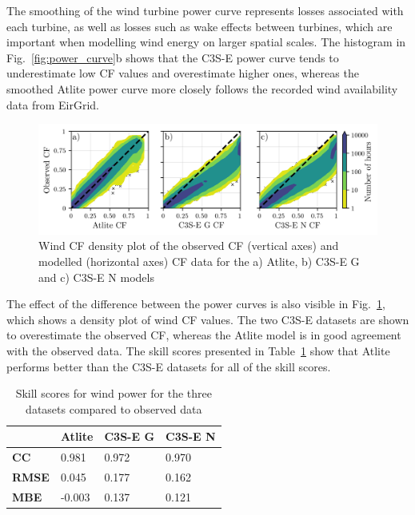 \documentclass[preprint, 12pt, authoryear]{elsarticle}
\begin{document}
The smoothing of the wind turbine power curve represents losses associated with each turbine, as well as losses such as wake effects between turbines, which are important when modelling wind energy on larger spatial scales. The histogram in Fig.~\ref{fig:power_curve}b shows that the C3S-E power curve tends to underestimate low CF values and overestimate higher ones, whereas the smoothed Atlite power curve more closely follows the recorded wind availability data from EirGrid.

\begin{figure}[!ht]
	\centering
	\includegraphics[width=\textwidth]{verification_wind_contour.png}
	\caption{Wind CF density plot of the observed CF (vertical axes) and modelled (horizontal axes) CF data for the a) Atlite, b) C3S-E G and c) C3S-E N models}
	\label{fig:wind_verification_contour}
\end{figure}

The effect of the difference between the power curves is also visible in Fig.~\ref{fig:wind_verification_contour}, which shows a density plot of wind CF values. The two C3S-E datasets are shown to overestimate the observed CF, whereas the Atlite model is in good agreement with the observed data. The skill scores presented in Table~\ref{tab:wind_skill_scores} show that Atlite performs better than the C3S-E datasets for all of the skill scores. 

\begin{table}[!ht]
	\centering
	\begin{tabular}{l|lll|}
		\cline{2-4}
		& \textbf{Atlite} & \textbf{C3S-E G} & \textbf{C3S-E N} \\ \hline
		\multicolumn{1}{|l|}{\textbf{CC}}   & 0.981           & 0.972            & 0.970            \\ \hline
		\multicolumn{1}{|l|}{\textbf{RMSE}} & 0.045           & 0.177            & 0.162            \\ \hline
		\multicolumn{1}{|l|}{\textbf{MBE}}   & -0.003          & 0.137            & 0.121            \\ \hline
	\end{tabular}
	\caption{Skill scores for wind power for the three datasets compared to observed data}
	\label{tab:wind_skill_scores}
\end{table}
\end{document}
